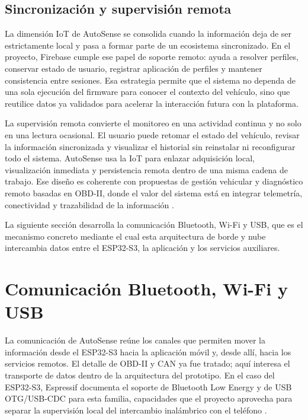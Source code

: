 \documentclass[12pt,letterpaper]{report}
\begin{document}
\subsection{Sincronización y supervisión remota}

La dimensión IoT de AutoSense se consolida cuando la información deja de ser estrictamente local y pasa a formar parte de un ecosistema sincronizado. En el proyecto, Firebase cumple ese papel de soporte remoto: ayuda a resolver perfiles, conservar estado de usuario, registrar aplicación de perfiles y mantener consistencia entre sesiones. Esa estrategia permite que el sistema no dependa de una sola ejecución del firmware para conocer el contexto del vehículo, sino que reutilice datos ya validados para acelerar la interacción futura con la plataforma.

La supervisión remota convierte el monitoreo en una actividad continua y no solo en una lectura ocasional. El usuario puede retomar el estado del vehículo, revisar la información sincronizada y visualizar el historial sin reinstalar ni reconfigurar todo el sistema. AutoSense usa la IoT para enlazar adquisición local, visualización inmediata y persistencia remota dentro de una misma cadena de trabajo. Ese diseño es coherente con propuestas de gestión vehicular y diagnóstico remoto basadas en OBD-II, donde el valor del sistema está en integrar telemetría, conectividad y trazabilidad de la información \cite{singh2021_obdii_iot,dabarera2022_iot_vehicle_management}.

La siguiente sección desarrolla la comunicación Bluetooth, Wi-Fi y USB, que es el mecanismo concreto mediante el cual esta arquitectura de borde y nube intercambia datos entre el ESP32-S3, la aplicación y los servicios auxiliares.

\section{Comunicación Bluetooth, Wi-Fi y USB}
\label{sec:comunicacion}

La comunicación de AutoSense reúne los canales que permiten mover la información desde el ESP32-S3 hacia la aplicación móvil y, desde allí, hacia los servicios remotos. El detalle de OBD-II y CAN ya fue tratado; aquí interesa el transporte de datos dentro de la arquitectura del prototipo. En el caso del ESP32-S3, Espressif documenta el soporte de Bluetooth Low Energy y de USB OTG/USB-CDC para esta familia, capacidades que el proyecto aprovecha para separar la supervisión local del intercambio inalámbrico con el teléfono \cite{espressif2026_esp32s3_get_started,espressif2026_esp32s3_ble_overview,espressif2026_esp32s3_usb_otg_console}.
\end{document}
